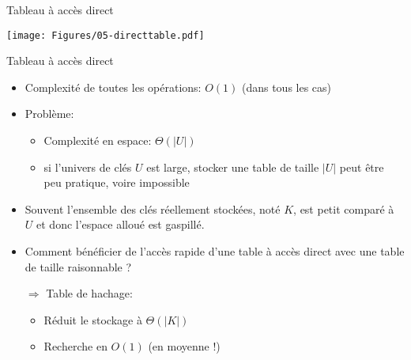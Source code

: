 \begin{frame}{Tableau à accès direct}

\centerline{\texttt{[image: Figures/05-directtable.pdf]}}

\begin{center}
\begin{small}


\end{small}
\end{center}


\end{frame}

\begin{frame}{Tableau à accès direct}

\begin{itemize}
\item Complexité de toutes les opérations: $O(1)$ (dans tous les cas)
\item Problème:
\begin{itemize}
\item Complexité en espace: $\Theta(|U|)$
\item si l'univers de clés $U$ est large, stocker une table de taille $|U|$ peut être peu pratique, voire impossible
\end{itemize}
\item Souvent l'ensemble des clés réellement stockées, noté $K$, est petit comparé à $U$ et donc l'espace alloué est gaspillé.

\bigskip\bigskip

\item Comment bénéficier de l'accès rapide d'une table à accès direct avec une table de taille raisonnable ?\\

\medskip

$\Rightarrow$ \alert{Table de hachage:}
\begin{itemize}
\item Réduit le stockage à $\Theta(|K|)$
\item Recherche en $O(1)$ (\alert{en moyenne} !)
\end{itemize}
\end{itemize}
\end{frame}

